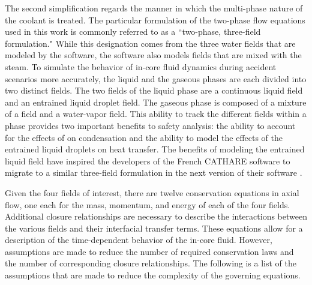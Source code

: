 The second simplification regards the manner in which the multi-phase nature of the coolant is treated.
The particular formulation of the two-phase flow equations used in this work is commonly referred to as a ``two-phase, three-field formulation."
While this designation comes from the three water fields that are modeled by the software, the software also models \ncg{} fields that are mixed with the steam.
To simulate the behavior of in-core fluid dynamics during accident scenarios more accurately, the liquid and the gaseous phases are each divided into two distinct fields.
The two fields of the liquid phase are a continuous liquid field and an entrained liquid droplet field.
The gaseous phase is composed of a mixture of a \ncg{} field and a water-vapor field. 
This ability to track the different fields within a phase provides two important benefits to safety analysis: the ability to account for the effects of \ncgs{} on condensation and the ability to model the effects of the entrained liquid droplets on heat transfer.
The benefits of modeling the entrained liquid field have inspired the developers of the French CATHARE software to migrate to a similar three-field formulation in the next version of their software \cite{Emonot2011}.

Given the four fields of interest, there are twelve conservation equations in axial flow, one each for the mass, momentum, and energy of each of the four fields.
Additional closure relationships are necessary to describe the interactions between the various fields and their interfacial transfer terms.
These equations allow for a description of the time-dependent behavior of the in-core fluid.
However, assumptions are made to reduce the number of required conservation laws and the number of corresponding closure relationships.
The following is a list of the assumptions that are made to reduce the complexity of the governing equations.

